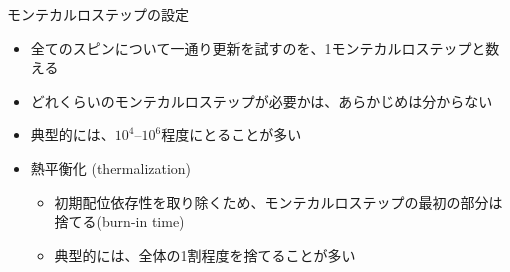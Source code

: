 
\begin{frame}[t,fragile]{モンテカルロステップの設定}
  \begin{itemize}
  \item 全てのスピンについて一通り更新を試すのを、1モンテカルロステップと数える
  \item どれくらいのモンテカルロステップが必要かは、あらかじめは分からない
  \item 典型的には、$10^4$--$10^6$程度にとることが多い
  \item 熱平衡化 (thermalization)
    \begin{itemize}
    \item 初期配位依存性を取り除くため、モンテカルロステップの最初の部分は捨てる(burn-in time)
    \item 典型的には、全体の1割程度を捨てることが多い
    \end{itemize}
  \end{itemize}
\end{frame}
